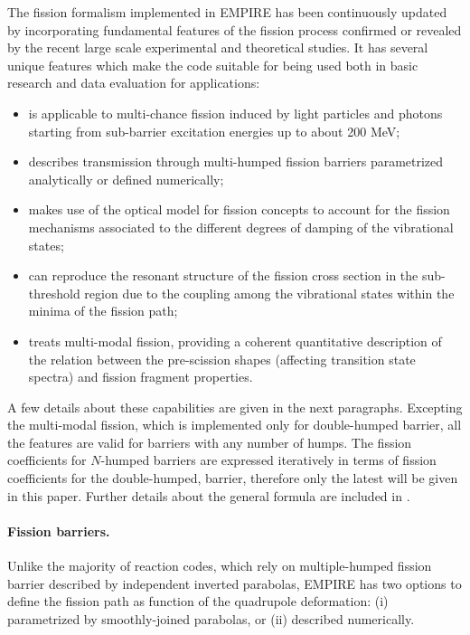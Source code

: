 \documentclass[twocolumn,amsmath,amssymb,10pt,groupedaddress,a4paper]{revtex4}
\begin{document}
The fission formalism implemented in EMPIRE has been continuously updated by incorporating
fundamental features of the fission process confirmed or revealed by the recent large scale
experimental and theoretical studies. It has several unique
features which make the code suitable for being used both in basic research and data
evaluation for applications:
\begin{itemize}
  \item is applicable to multi-chance  fission induced by light particles and photons
starting from sub-barrier excitation energies up to  about 200 MeV;
  \item describes transmission through multi-humped fission barriers parametrized analytically
or defined numerically;
  \item makes use of the optical model for fission concepts to account for the fission
mechanisms associated to the different degrees of damping of the vibrational states;
  \item can reproduce the resonant structure of the fission cross section in the
sub-threshold region due to the coupling among the vibrational states within the minima of
the fission path;
  \item treats multi-modal fission, providing a coherent
quantitative description of the relation between the pre-scission shapes (affecting
transition state spectra) and fission fragment properties.
\end{itemize}
A few details about these capabilities are given in the next paragraphs. Excepting the
multi-modal fission, which is implemented only for double-humped barrier, all the features
are valid for barriers with any number of humps. The fission coefficients for $N$-humped
barriers are expressed iteratively in terms of fission coefficients for the double-humped,
barrier, therefore only the latest will be given in this paper. Further details about the
general formula are included in \cite{Sin:07}.
\\


\paragraph*{Fission barriers.}
Unlike the majority of reaction codes, which rely on multiple-humped fission
barrier described by independent inverted parabolas, EMPIRE has two options
to define the fission path as function of the quadrupole deformation:
(i) parametrized by smoothly-joined parabolas, or
(ii) described numerically.
\end{document}

